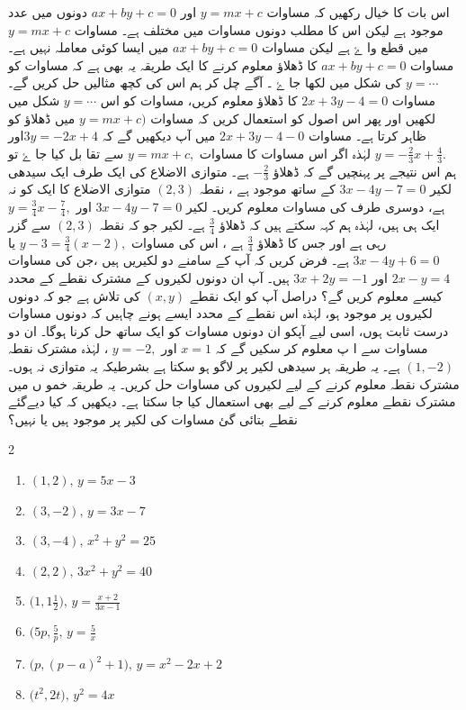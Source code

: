 اس بات کا خیال رکھیں کہ مساوات  \( y=mx+c \) اور \( ax+by+c=0 \) دونوں میں عدد   موجود ہے لیکن اس کا مطلب دونوں مساوات میں مختلف ہے۔ مساوات \( y=mx+c \) میں   قطع وا ۓ ہے لیکن مساوات \( ax+by+c=0 \) میں ایسا  کوئی معاملہ نہیں ہے۔
مساوات \( ax+by+c=0 \) کا ڈھلاؤ معلوم کرنے کا ایک طریقہ یہ بھی ہے کہ مساوات کو  \( y= \cdots \) کی شکل میں لکھا جا ۓ ۔ آگے چل کر ہم اس کی کچھ مثالیں حل کریں گے۔
مساوات \( 2x+3y-4=0 \) کا ڈھلاؤ معلوم کریں،
مساوات کو اس \( y= \cdots \) شکل میں لکھیں اور پھر اس اصول کو استعمال کریں کہ مساوات \( y=mx+c) \) میں  ڈھلاؤ کو ظاہر کرتا ہے۔ 
مساوات \(  2x+3y-4-0 \) میں آپ دیکھیں گے کہ \( 3y = -2x +4 \)اور\( y= - \frac{2}{3} x + \frac{4}{3}. \) لہٰذہ اگر اس مساوات کا  مساوات \( y=mx+c ,\) سے  تقا بل کیا جا ۓ تو ہم اس نتیجے پر پہنچیں گے کہ ڈھلاؤ  \(- \frac{2}{3} \) ہے۔
متوازی الاضلاع کی ایک طرف ایک سیدھی لکیر \( 3x -4y -7 = 0 \) کے ساتھ موجود ہے ، نقطہ \( (2,3) \) متوازی الاضلاع کا ایک کو نہ ہے، دوسری طرف کی مساوات معلوم کریں۔
لکیر \( 3x-4y-7=0 \) اور \( y= \frac{3}{4}x - \frac{7}{4} , \) ایک ہی ہیں، لہٰذہ ہم کہہ سکتے ہیں کہ ڈھلاؤ \( \frac{3}{4}\) ہے۔ لکیر جو کہ نقطہ \( (2,3) \) سے گزر رہی ہے اور جس کا ڈھلاؤ \( \frac{3}{4}\) ہے ، اس کی مساوات \( y-3=\frac{3}{4} (x-2) , \) یا \( 3x-4y+6=0 \) ہے۔
فرض کریں کہ آپ کے سامنے دو لکیریں ہیں ،جن کی مساوات \( 2x-y=4  \) اور \(  3x+2y=-1\) ہیں۔ آپ ان دونوں لکیروں کے مشترک نقطے کے محدد کیسے معلوم کریں گے؟
دراصل آپ کو ایک نقطے \(  (x,y)    \) کی تلاش ہے جو کہ دونوں لکیروں پر موجود ہو، لہٰذہ اس نقطے کے محدد ایسے ہونے چاہیں کہ دونوں مساوات درست  ثابت ہوں، اسی لیے آپکو ان دونوں مساوات کو ایک ساتھ حل کرنا ہوگا۔
ان دو مساوات سے  ا پ معلوم کر سکیں گے کہ \( x=1\) اور \( y=-2, \) ، لہٰذہ مشترک نقطہ \( (1,-2) \) ہے۔ 
یہ طریقہ ہر سیدھی لکیر پر لاگو ہو سکتا ہے بشرطیکہ یہ متوازی نہ ہوں۔ مشترک نقطہ معلوم کرنے کے لیے لکیروں کی مساوات حل کریں۔ یہ طریقہ خمو ں میں مشترک نقطے معلوم کرنے کے لیے بھی استعمال کیا جا سکتا ہے۔ 
دیکھیں کہ کیا دیےگئے  نقطے بتائی گئ مساوات کی لکیر پر موجود ہیں یا نہیں؟
\begin{multicols}{2}
   \begin{enumerate}[.a]
\item \( (1,2),\,y=5x-3 \)
\item \( (3,-2),\,y=3x-7 \)
\item \( (3,-4),\,x^2 + y^2 = 25 \)
\item \( (2,2),\,3x^2 + y^2 = 40 \)
\item \( \big(1,1\frac{1}{2} \big),\,y=\frac{x+2}{3x-1} \)
\item \( \big( 5p, \frac{5}{p},\,y=\frac{5}{x} \)
\item \( \big(p,(p-a)^2 +1 \big),\,y=x^2 -2x +2 \)
\item \( \big( t^2, 2t \big),\,y^2 = 4x \)
\end{enumerate}
\end{multicols}
